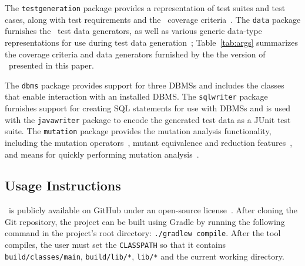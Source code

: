 

The \texttt{testgeneration} package provides a representation of test suites and test cases, along with test
requirements and the \numcoveragecriteria~coverage criteria~\cite{mcminn2015effectiveness}. The \texttt{data} package
furnishes the \numdatagenerators~test data generators, as well as various generic data-type representations for use
during test data generation~\cite{mcminn2015effectiveness}; Table~\ref{tab:args} summarizes the coverage criteria and
data generators furnished by the the version of \sa~presented in this paper.


The \texttt{dbms} package provides support for three DBMSs and includes the classes that enable interaction with an
installed DBMS\@. The \texttt{sqlwriter} package furnishes support for creating SQL statements for use with DBMSs and
is used with the \texttt{javawriter} package to encode the generated test data as a JUnit test suite.  The
\texttt{mutation} package provides the mutation analysis functionality, including the mutation
operators~\cite{wright2015mutation}, mutant equivalence and reduction features~\cite{wright2014impact}, and means for
quickly performing mutation analysis~\cite{mcminn2016virtual}.

\subsection{Usage Instructions}



\sa~is publicly available on GitHub under an open-source license~\cite{tool}.
After cloning the Git repository, the project can be built using Gradle by
running the following command in the project's root directory:
\lstinline{./gradlew compile}. After the tool compiles, the user must set the
\lstinline{CLASSPATH} so that it contains \lstinline{build/classes/main},
\lstinline{build/lib/*}, \lstinline{lib/*} and the current working directory.

